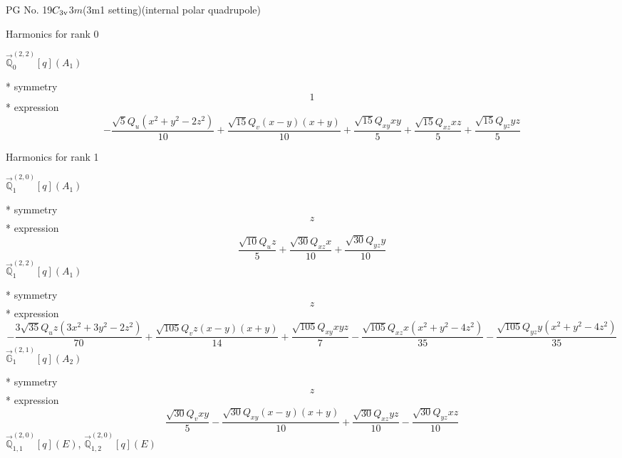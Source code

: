 \documentclass[fleqn,8pt]{jsarticle}
\begin{document}
\setcounter{MaxMatrixCols}{32}

\renewcommand{\tablename}{Table~}
\renewcommand{\figurename}{Figure~}
\begin{center}
\LARGE
PG No. 19\quad$C_{\rm 3v}$\quad$3m$\quad(3m1 setting)\quad[ trigonal ] (internal polar quadrupole)
\end{center}

\noindent * Harmonics for rank 0

\noindent\quad $\vec{\mathbb{Q}}_{0}^{(2,2)}[q](A_{1})$

\noindent\quad ** symmetry
\begin{dmath*}
1
\end{dmath*}
\noindent\quad ** expression
\begin{dmath*}
- \frac{\sqrt{5} Q_{u} \left(x^{2} + y^{2} - 2 z^{2}\right)}{10} + \frac{\sqrt{15} Q_{v} \left(x - y\right) \left(x + y\right)}{10} + \frac{\sqrt{15} Q_{xy} x y}{5} + \frac{\sqrt{15} Q_{xz} x z}{5} + \frac{\sqrt{15} Q_{yz} y z}{5}
\end{dmath*}

\noindent * Harmonics for rank 1

\noindent\quad $\vec{\mathbb{Q}}_{1}^{(2,0)}[q](A_{1})$

\noindent\quad ** symmetry
\begin{dmath*}
z
\end{dmath*}
\noindent\quad ** expression
\begin{dmath*}
\frac{\sqrt{10} Q_{u} z}{5} + \frac{\sqrt{30} Q_{xz} x}{10} + \frac{\sqrt{30} Q_{yz} y}{10}
\end{dmath*}
\noindent\quad $\vec{\mathbb{Q}}_{1}^{(2,2)}[q](A_{1})$

\noindent\quad ** symmetry
\begin{dmath*}
z
\end{dmath*}
\noindent\quad ** expression
\begin{dmath*}
- \frac{3 \sqrt{35} Q_{u} z \left(3 x^{2} + 3 y^{2} - 2 z^{2}\right)}{70} + \frac{\sqrt{105} Q_{v} z \left(x - y\right) \left(x + y\right)}{14} + \frac{\sqrt{105} Q_{xy} x y z}{7} - \frac{\sqrt{105} Q_{xz} x \left(x^{2} + y^{2} - 4 z^{2}\right)}{35} - \frac{\sqrt{105} Q_{yz} y \left(x^{2} + y^{2} - 4 z^{2}\right)}{35}
\end{dmath*}
\noindent\quad $\vec{\mathbb{G}}_{1}^{(2,1)}[q](A_{2})$

\noindent\quad ** symmetry
\begin{dmath*}
z
\end{dmath*}
\noindent\quad ** expression
\begin{dmath*}
\frac{\sqrt{30} Q_{v} x y}{5} - \frac{\sqrt{30} Q_{xy} \left(x - y\right) \left(x + y\right)}{10} + \frac{\sqrt{30} Q_{xz} y z}{10} - \frac{\sqrt{30} Q_{yz} x z}{10}
\end{dmath*}
\noindent\quad $\vec{\mathbb{Q}}_{1,1}^{(2,0)}[q](E)$, $\vec{\mathbb{Q}}_{1,2}^{(2,0)}[q](E)$
\end{document}
